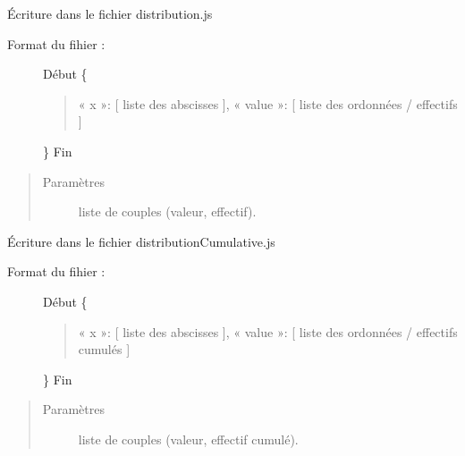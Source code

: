 \documentclass[letterpaper,10pt,openany,oneside,french]{sphinxmanual}
\begin{document}

\begin{fulllineitems}
\label{\detokenize{addQuantitativesDiscretes:add.addQuantitativesDiscretes.infoDistributionDiscrete}}
Écriture dans le fichier distribution.js
\begin{description}
\item[{Format du fihier :}] \leavevmode
Début
\{
\begin{quote}

« x »: {[} liste des abscisses {]},
« value »: {[} liste des ordonnées / effectifs {]}
\end{quote}

\}
Fin

\end{description}
\begin{quote}\begin{description}
\item[{Paramètres}] \leavevmode
{} \textendash{} liste de couples (valeur, effectif).

\end{description}\end{quote}

\end{fulllineitems}


\begin{fulllineitems}
\label{\detokenize{addQuantitativesDiscretes:add.addQuantitativesDiscretes.infoDistributionCumulativeDiscrete}}
Écriture dans le fichier distributionCumulative.js
\begin{description}
\item[{Format du fihier :}] \leavevmode
Début
\{
\begin{quote}

« x »: {[} liste des abscisses {]},
« value »: {[} liste des ordonnées / effectifs cumulés {]}
\end{quote}

\}
Fin

\end{description}
\begin{quote}\begin{description}
\item[{Paramètres}] \leavevmode
{} \textendash{} liste de couples (valeur, effectif cumulé).

\end{description}\end{quote}

\end{fulllineitems}
\end{document}

